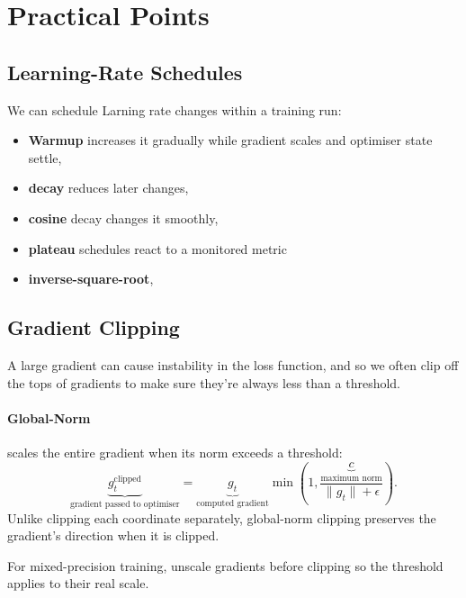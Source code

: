 \section{Practical Points}

\subsection{Learning-Rate Schedules}
\label{sec:optimisation-learning-rate-schedules-and-warmup}
We can schedule Larning rate changes within a training run:
\begin{itemize}
    \item \textbf{Warmup} increases it gradually while gradient scales and optimiser state settle,
    \item \textbf{decay} reduces later changes,
    \item \textbf{cosine} decay changes it smoothly,
    \item \textbf{plateau} schedules react to a monitored metric
    \item \textbf{inverse-square-root}, 
\end{itemize}





\subsection{Gradient Clipping}
A large gradient can cause instability in the loss function, and so we often clip off the tops of gradients to make sure they're always less than a threshold. 

\paragraph{Global-Norm } scales the entire gradient when its norm exceeds a threshold:
\[
    \underbrace{g_t^{\text{clipped}}}_{\text{gradient passed to optimiser}}
    =
    \underbrace{g_t}_{\text{computed gradient}}
    \min\!\left(1,\frac{\underbrace{c}_{\text{maximum norm}}}{\|g_t\|+\epsilon}\right).
\]
Unlike clipping each coordinate separately, global-norm clipping preserves the gradient's direction when it is clipped.

\begin{calloutpractical}
    For mixed-precision training, unscale gradients before clipping so the threshold applies to their real scale.
\end{calloutpractical}

